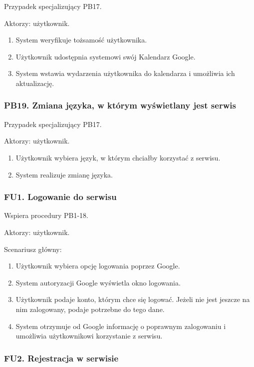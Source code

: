 \documentclass[11pt,a4paper]{article}
\renewcommand{\_}{\char`_}
\begin{document}
Przypadek specjalizujący PB17.

Aktorzy: użytkownik.
\begin{enumerate}
    \item System weryfikuje tożsamość użytkownika.
    \item Użytkownik udostępnia systemowi swój Kalendarz Google.
    \item System wstawia wydarzenia użytkownika do kalendarza i umożliwia ich aktualizację.
\end{enumerate}

\subsubsection{PB19. Zmiana języka, w którym wyświetlany jest serwis}

Przypadek specjalizujący PB17.

Aktorzy: użytkownik.
\begin{enumerate}
    \item Użytkownik wybiera język, w którym chciałby korzystać z serwisu.
    \item System realizuje zmianę języka.
\end{enumerate}

\subsubsection{FU1. Logowanie do serwisu}

Wspiera procedury PB1-18.

Aktorzy: użytkownik.

Scenariusz główny:
\begin{enumerate}
    \item Użytkownik wybiera opcję logowania poprzez Google.
    \item System autoryzacji Google wyświetla okno logowania.
    \item Użytkownik podaje konto, którym chce się logować. Jeżeli nie jest jeszcze na nim zalogowany, podaje potrzebne do tego dane.
    \item System otrzymuje od Google informację o poprawnym zalogowaniu i umożliwia użytkownikowi korzystanie z serwisu.
\end{enumerate}

\subsubsection{FU2. Rejestracja w serwisie}
\end{document}

